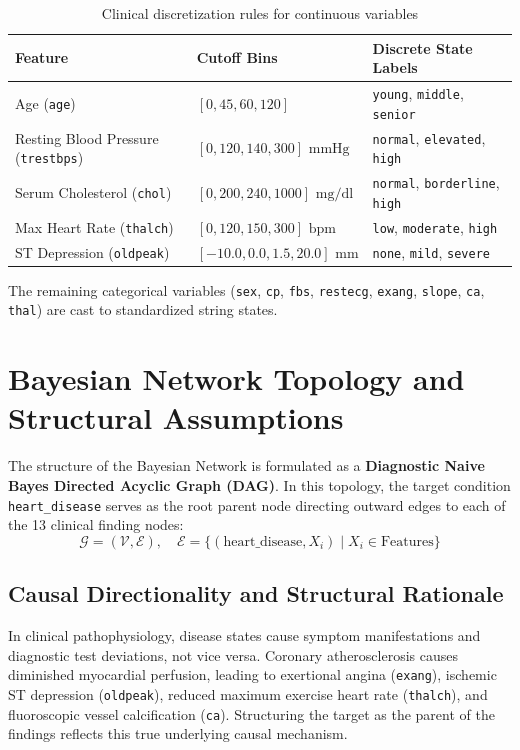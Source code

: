 \documentclass[12pt,a4paper]{report}
\begin{document}
\begin{table}[!htbp]
\centering
\caption{Clinical discretization rules for continuous variables}
\begin{tabular}{lll}
\toprule
\textbf{Feature} & \textbf{Cutoff Bins} & \textbf{Discrete State Labels} \\
\midrule
Age (\texttt{age}) & $[0, 45, 60, 120]$ & \texttt{young}, \texttt{middle}, \texttt{senior} \\
Resting Blood Pressure (\texttt{trestbps}) & $[0, 120, 140, 300]\text{ mmHg}$ & \texttt{normal}, \texttt{elevated}, \texttt{high} \\
Serum Cholesterol (\texttt{chol}) & $[0, 200, 240, 1000]\text{ mg/dl}$ & \texttt{normal}, \texttt{borderline}, \texttt{high} \\
Max Heart Rate (\texttt{thalch}) & $[0, 120, 150, 300]\text{ bpm}$ & \texttt{low}, \texttt{moderate}, \texttt{high} \\
ST Depression (\texttt{oldpeak}) & $[-10.0, 0.0, 1.5, 20.0]\text{ mm}$ & \texttt{none}, \texttt{mild}, \texttt{severe} \\
\bottomrule
\end{tabular}
\label{tab:discretization}
\end{table}

The remaining categorical variables (\texttt{sex}, \texttt{cp}, \texttt{fbs}, \texttt{restecg}, \texttt{exang}, \texttt{slope}, \texttt{ca}, \texttt{thal}) are cast to standardized string states.

\section{Bayesian Network Topology and Structural Assumptions}

The structure of the Bayesian Network is formulated as a \textbf{Diagnostic Naive Bayes Directed Acyclic Graph (DAG)}. In this topology, the target condition \texttt{heart\_disease} serves as the root parent node directing outward edges to each of the 13 clinical finding nodes:
\begin{equation}
\mathcal{G} = \left( \mathcal{V}, \mathcal{E} \right), \quad \mathcal{E} = \{ (\text{heart\_disease}, X_i) \mid X_i \in \text{Features} \}
\end{equation}

\subsection{Causal Directionality and Structural Rationale}
In clinical pathophysiology, disease states cause symptom manifestations and diagnostic test deviations, not vice versa. Coronary atherosclerosis causes diminished myocardial perfusion, leading to exertional angina (\texttt{exang}), ischemic ST depression (\texttt{oldpeak}), reduced maximum exercise heart rate (\texttt{thalch}), and fluoroscopic vessel calcification (\texttt{ca}). Structuring the target as the parent of the findings reflects this true underlying causal mechanism.
\end{document}
